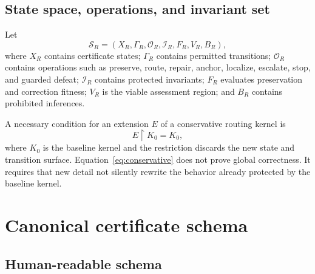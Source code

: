 \documentclass[10pt]{article}
\newcommand{\FSS}{\mathcal{S}}
\begin{document}
\subsection{State space, operations, and invariant set}

Let
\begin{equation}
\FSS_R=(X_R,\Gamma_R,\mathcal{O}_R,\mathcal{I}_R,F_R,V_R,B_R),
\end{equation}
where $X_R$ contains certificate states; $\Gamma_R$ contains permitted transitions; $\mathcal{O}_R$ contains operations such as preserve, route, repair, anchor, localize, escalate, stop, and guarded defeat; $\mathcal{I}_R$ contains protected invariants; $F_R$ evaluates preservation and correction fitness; $V_R$ is the viable assessment region; and $B_R$ contains prohibited inferences.

A necessary condition for an extension $E$ of a conservative routing kernel is
\begin{equation}
E\restriction K_0=K_0,
\label{eq:conservative}
\end{equation}
where $K_0$ is the baseline kernel and the restriction discards the new state and transition surface. Equation~\eqref{eq:conservative} does not prove global correctness. It requires that new detail not silently rewrite the behavior already protected by the baseline kernel.

\section{Canonical certificate schema}
\label{sec:schema}

\subsection{Human-readable schema}
\end{document}
